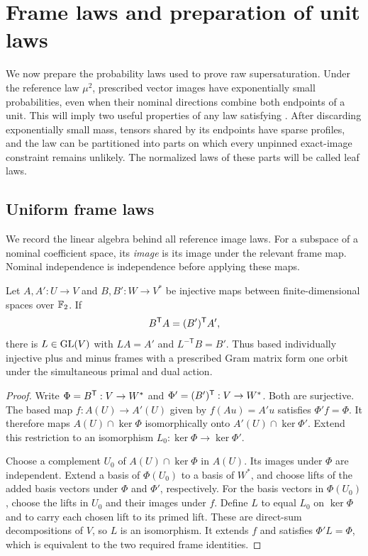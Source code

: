 \section{Frame laws and preparation of unit laws}\label{sec:frame-laws}

We now prepare the probability laws used to prove raw supersaturation.
Under the reference law \(\mu^2\), prescribed vector images have
exponentially small probabilities, even when their nominal directions
combine both endpoints of a unit. This will imply two useful properties
of any law satisfying . After discarding
exponentially small mass, tensors shared by its endpoints have sparse
profiles, and the law can be partitioned into
parts on which every unpinned exact-image constraint remains unlikely.
The normalized laws of these parts will be called leaf laws.

\subsection{Uniform frame laws}

We record the linear algebra behind all reference image laws.
For a subspace of a nominal coefficient space, its \emph{image} is its image under the relevant frame map.
Nominal independence is independence before applying these maps.

\begin{lemma}\label{lem:paired-frame-orbit}
Let \(A,A':U\to V\) and \(B,B':W\to V^*\) be injective maps between finite-dimensional spaces over \(\mathbb F_2\).
If
\[
 B^{\mathsf T} A=(B')^{\mathsf T} A',
\]
there is \(L\in\operatorname{GL}(V)\) with \(LA=A'\) and \(L^{-\mathsf T}B=B'\).
Thus based individually injective plus and minus frames with a prescribed Gram matrix form one orbit under the simultaneous primal and dual action.
\end{lemma}
\begin{proof}
Write \(\Phi=B^{\mathsf T}:V\to W^*\) and \(\Phi'=(B')^{\mathsf T}:V\to W^*\).
Both are surjective.
The based map \(f:A(U)\to A'(U)\) given by \(f(Au)=A'u\) satisfies \(\Phi'f=\Phi\).
It therefore maps \(A(U)\cap\ker\Phi\) isomorphically onto \(A'(U)\cap\ker\Phi'\).
Extend this restriction to an isomorphism \(L_0:\ker\Phi\to\ker\Phi'\).

Choose a complement \(U_0\) of \(A(U)\cap\ker\Phi\) in \(A(U)\).
Its images under \(\Phi\) are independent.
Extend a basis of \(\Phi(U_0)\) to a basis of \(W^*\), and choose lifts of the added basis vectors under \(\Phi\) and \(\Phi'\), respectively.
For the basis vectors in \(\Phi(U_0)\), choose the lifts in \(U_0\) and their images under \(f\).
Define \(L\) to equal \(L_0\) on \(\ker\Phi\) and to carry each chosen lift to its primed lift.
These are direct-sum decompositions of \(V\), so \(L\) is an isomorphism.
It extends \(f\) and satisfies \(\Phi'L=\Phi\), which is equivalent to the two required frame identities.
\end{proof}

